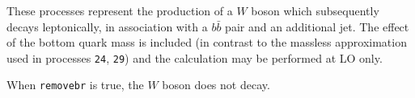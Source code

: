 \label{subsec:wbbjetmassive}

These processes represent the production of a $W$ boson which subsequently
decays leptonically, in association with a $b{\bar b}$ pair and an
additional jet. The effect of the bottom quark mass is included (in contrast to
the massless approximation used in processes {\tt 24}, {\tt 29})
and the calculation may be performed at LO only.

When {\tt removebr} is true, the $W$ boson does not decay.

